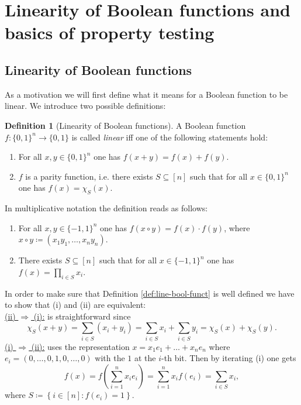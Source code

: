 \documentclass[a4paper]{article}
\newcommand{\nset}{[n]}
\theoremstyle{plain}
\theoremstyle{definition}
\newtheorem{definition}{Definition}
\begin{document}
\section{Linearity of Boolean functions and basics of property testing}
\label{sec:line-bool-funct}

\subsection{Linearity of Boolean functions}
\label{sec:line-bool-funct-1}

As a motivation we will first define what it means for a Boolean
function to be linear. We introduce two possible definitions: 

\begin{definition}[Linearity of Boolean functions] \label{def:1}
  A Boolean function \(f: \{0,1\}^n \rightarrow \{0,1\}\) is called \emph{linear}
  iff one of the following statements hold: 
  \begin{enumerate}[label= (\roman*)]
  \item For all \(x,y \in \{0,1\}^n\) one has \(f(x+y) = f(x) + f(y)\).
  \item \(f\) is a parity function, i.e. there exists \(S \subseteq
    \nset\) such that for all \(x \in \{0,1\}^n\) one has \(f(x) =
    \chi_S(x)\). 
  \end{enumerate}
\end{definition}

\noindent In multiplicative notation the definition reads as follows: 
\begin{enumerate}[label= (\roman*)]
\item For all \(x,y \in \{-1,1\}^n\) one has \(f(x\circ y) = f(x)\cdot
  f(y)\), where \(x\circ y \coloneqq (x_1y_1, \dots, x_ny_n)\).
\item There exists \(S \subseteq \nset\) such that for all \(x\in
  \{-1,1\}^n\) one has \(f(x) = \prod_{i\in S} x_i\). 
\end{enumerate}

\noindent In order to make sure that Definition
\ref{def:line-bool-funct} is well defined we have to show that (i) and
(ii) are equivalent: \\
\underline{(ii) \(\Rightarrow\) (i):} is straightforward since 
\[\chi_S(x+y) = \sum_{i\in S} (x_i + y_i) = \sum_{i\in S} x_i +
\sum_{i\in S} y_i = \chi_S(x) + \chi_S(y).\]
\underline{(i) \(\Rightarrow\) (ii):} uses the representation \(x =
x_1 e_1 + \dots + x_n e_n\) where \(e_i = (0,\dots,0,1,0,\dots,0)\)
with the \(1\) at the \(i\)-th bit. Then by iterating (i) one gets
\[f(x) = f\left(\sum_{i=1}^{n} x_i e_i\right) = \sum_{i=1}^{n} x_i f(e_i) =
\sum_{i\in S} x_i, \]
where \(S \coloneqq \left\{i\in \nset : f(e_i) = 1 \right\}\). \\
\end{document}
